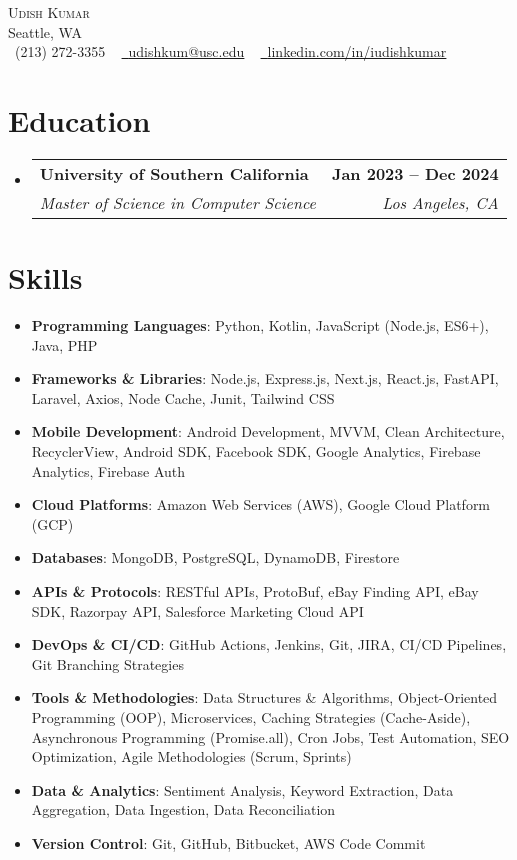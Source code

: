 \documentclass[letterpaper,10pt]{article}
\makeatletter
\newcommand{\resumeItem}[1]{
  \item\small{
    {#1 \vspace{-2pt}}
  }
}
\newcommand{\resumeSubheading}[4]{
  \vspace{-2pt}\item
    \begin{tabular*}{1.0\textwidth}[t]{l@{\extracolsep{\fill}}r}
      \textbf{#1} & \textbf{\small #2} \\
      \textit{\small#3} & \textit{\small #4} \\
    \end{tabular*}\vspace{-7pt}
}
\newcommand{\resumeSubHeadingListStart}{\begin{itemize}[leftmargin=0.15in, label={}]}
\newcommand{\resumeSubHeadingListEnd}{\end{itemize}}
\newcommand{\resumeItemListStart}{\begin{itemize}[leftmargin=*, itemsep=-1pt]}
\newcommand{\resumeItemListEnd}{\end{itemize}\vspace{-5pt}}
\makeatother
\begin{document}
\begin{center}
    {\Huge \scshape Udish Kumar} \\ \vspace{1pt}
    Seattle, WA \\ \vspace{1pt}
    \small \raisebox{-0.1\height}\faPhone\ (213) 272-3355 ~ \href{mailto:udishkum@usc.edu}{\raisebox{-0.2\height}\faEnvelope\  \underline{udishkum@usc.edu}} ~ 
    \href{https://linkedin.com/in/iudishkumar/}{\raisebox{-0.2\height}\faLinkedin\ \underline{linkedin.com/in/iudishkumar}}
    \vspace{-8pt}
\end{center}
\vspace{-10pt}

\section{Education}
\resumeSubHeadingListStart
  \resumeSubheading
    {University of Southern California}{Jan 2023 -- Dec 2024}
    {Master of Science in Computer Science}{Los Angeles, CA}
\resumeSubHeadingListEnd
\vspace{-1pt}

\section{Skills}
\resumeItemListStart
  \resumeItem{\textbf{Programming Languages}: Python, Kotlin, JavaScript (Node.js, ES6+), Java, PHP}
  \resumeItem{\textbf{Frameworks \& Libraries}: Node.js, Express.js, Next.js, React.js, FastAPI, Laravel, Axios, Node Cache, Junit, Tailwind CSS}
  \resumeItem{\textbf{Mobile Development}: Android Development, MVVM, Clean Architecture, RecyclerView, Android SDK, Facebook SDK, Google Analytics, Firebase Analytics, Firebase Auth}
  \resumeItem{\textbf{Cloud Platforms}: Amazon Web Services (AWS), Google Cloud Platform (GCP)}
  \resumeItem{\textbf{Databases}: MongoDB, PostgreSQL, DynamoDB, Firestore}
  \resumeItem{\textbf{APIs \& Protocols}: RESTful APIs, ProtoBuf, eBay Finding API, eBay SDK, Razorpay API, Salesforce Marketing Cloud API}
  \resumeItem{\textbf{DevOps \& CI/CD}: GitHub Actions, Jenkins, Git, JIRA, CI/CD Pipelines, Git Branching Strategies}
  \resumeItem{\textbf{Tools \& Methodologies}: Data Structures \& Algorithms, Object-Oriented Programming (OOP), Microservices, Caching Strategies (Cache-Aside), Asynchronous Programming (Promise.all), Cron Jobs, Test Automation, SEO Optimization, Agile Methodologies (Scrum, Sprints)}
  \resumeItem{\textbf{Data \& Analytics}: Sentiment Analysis, Keyword Extraction, Data Aggregation, Data Ingestion, Data Reconciliation}
  \resumeItem{\textbf{Version Control}: Git, GitHub, Bitbucket, AWS Code Commit}
\resumeItemListEnd
\vspace{-1pt}
\end{document}
